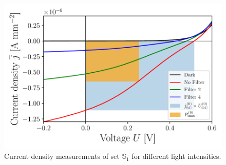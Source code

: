 \begin{figure}[ht]\centering
\includegraphics[width=\columnwidth]{../../../IV-Curve-Analysis/OSC2Graph.pdf}
\caption{Current density measurements of set $\mathbb{S}_1$ for different light intensities.}
\label{fig:OSC3Graph}
\end{figure}

